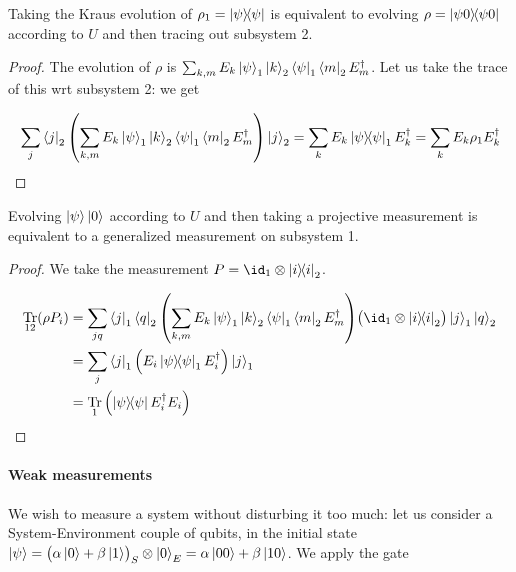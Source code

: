 \documentclass[main.tex]{subfiles}
\begin{document}
\begin{claim}
Taking the Kraus evolution of \(\rho_1 = \dyad{\psi}\) is equivalent to evolving \( \rho = \dyad{\psi 0} \) according to \(U\) and then tracing out subsystem 2.
\end{claim}

\begin{proof}
The evolution of \(\rho\) is \( \sum _{k, m}  E_k \ket{\psi}_1 \ket{k} _2
 \bra{\psi}_1 \bra{m} _2 E_m ^\dag\). Let us take the trace of this wrt subsystem 2: we get

\begin{equation}
     \sum _{j} \bra{j}_2  \qty(\sum _{k, m}  E_k \ket{\psi}_1 \ket{k} _2
      \bra{\psi}_1 \bra{m} _2 E_m ^\dag) \ket{j}_2
      = \sum _{k} E_k \dyad{\psi}_1 E_k ^\dag
      = \sum _{k} E_k \rho_1 E_k ^\dag
\end{equation}
\end{proof}

\begin{claim}
Evolving \(\ket{\psi} \ket{0} \) according to \(U\) and then taking a projective measurement is equivalent to a generalized measurement on subsystem 1.
\end{claim}

\begin{proof}
We take the measurement \(P = \id_1 \otimes \dyad{i} _2\).

\begin{subequations}
\begin{align}
  \Tr_{12} (\rho P_i) &= \sum _{jq} \bra{j} _1 \bra{q} _2
  \qty(\sum _{k, m}  E_k \ket{\psi}_1 \ket{k} _2
  \bra{\psi}_1 \bra{m} _2 E_m ^\dag)
  \qty(\id_1 \otimes \dyad{i}_2 )
  \ket{j} _1 \ket{q} _2  \\
  &= \sum _{j} \bra{j} _1
  \qty( E_i \dyad{\psi}_1  E_i ^\dag  )
  \ket{j} _1  \\
  &= \Tr_1 \qty(\dyad{\psi} E_i ^\dag E_i )
\end{align}
\end{subequations}
\end{proof}

\paragraph{Weak measurements}

We wish to measure a system without disturbing it too much: let us consider a System-Environment couple of qubits, in the initial state \(\ket\psi = \qty(\alpha \ket{0} + \beta \ket{1} )_S \otimes \ket{0} _E = \alpha \ket{00} + \beta \ket{10} \). We apply the gate
\end{document}
